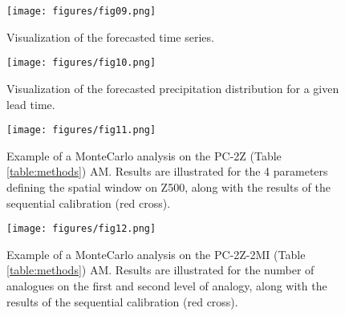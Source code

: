 \documentclass[review]{elsarticle}
\begin{document}
\begin{figure}[t]
	\texttt{[image: figures/fig09.png]}
	\caption{Visualization of the forecasted time series.}
	\label{figure:atmoswing-viewer-timeseries}
\end{figure}

\begin{figure}[t]
	\texttt{[image: figures/fig10.png]}
	\caption{Visualization of the forecasted precipitation distribution for a given lead time.}
	\label{figure:atmoswing-viewer-distribution}
\end{figure}

\begin{figure}[t]
	\texttt{[image: figures/fig11.png]}
	\caption{Example of a Monte\textendash Carlo analysis on the PC-2Z (Table \ref{table:methods}) AM. Results are illustrated for the 4 parameters defining the spatial window on Z500, along with the results of the sequential calibration (red cross).}
	\label{figure:monte_carlo_r1}
\end{figure}

\begin{figure}[t]
	\texttt{[image: figures/fig12.png]}
	\caption{Example of a Monte\textendash Carlo analysis on the PC-2Z-2MI (Table \ref{table:methods}) AM. Results are illustrated for the number of analogues on the first and second level of analogy, along with the results of the sequential calibration (red cross).}
	\label{figure:monte_carlo_r2}
\end{figure}

\clearpage
\end{document}
